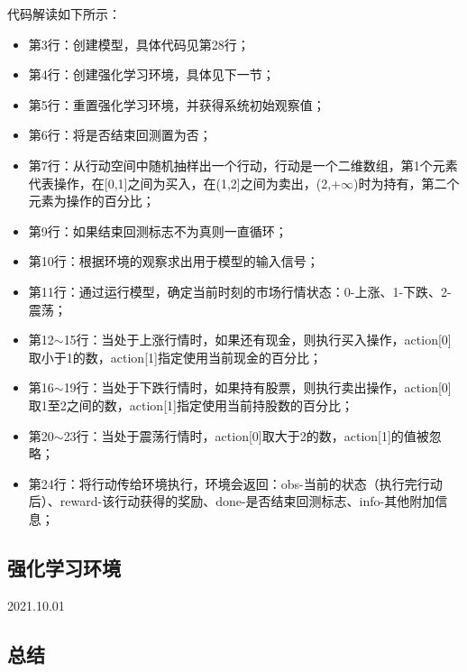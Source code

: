 代码解读如下所示：
\begin{itemize}
    \item 第3行：创建模型，具体代码见第28行；
    \item 第4行：创建强化学习环境，具体见下一节；
    \item 第5行：重置强化学习环境，并获得系统初始观察值；
    \item 第6行：将是否结束回测置为否；
    \item 第7行：从行动空间中随机抽样出一个行动，行动是一个二维数组，第1个元素代表操作，在[0,1]之间为买入，在(1,2]之间为卖出，(2,+$\infty$)时为持有，第二个
    元素为操作的百分比；
    \item 第9行：如果结束回测标志不为真则一直循环；
    \item 第10行：根据环境的观察求出用于模型的输入信号；
    \item 第11行：通过运行模型，确定当前时刻的市场行情状态：0-上涨、1-下跌、2-震荡；
    \item 第12$\sim$15行：当处于上涨行情时，如果还有现金，则执行买入操作，action[0]取小于1的数，action[1]指定使用当前现金的百分比；
    \item 第16$\sim$19行：当处于下跌行情时，如果持有股票，则执行卖出操作，action[0]取1至2之间的数，action[1]指定使用当前持股数的百分比；
    \item 第20$\sim$23行：当处于震荡行情时，action[0]取大于2的数，action[1]的值被忽略；
    \item 第24行：将行动传给环境执行，环境会返回：obs-当前的状态（执行完行动后）、reward-该行动获得的奖励、done-是否结束回测标志、info-其他附加信息；
\end{itemize}

\subsection{强化学习环境}
2021.10.01

\subsection{总结}